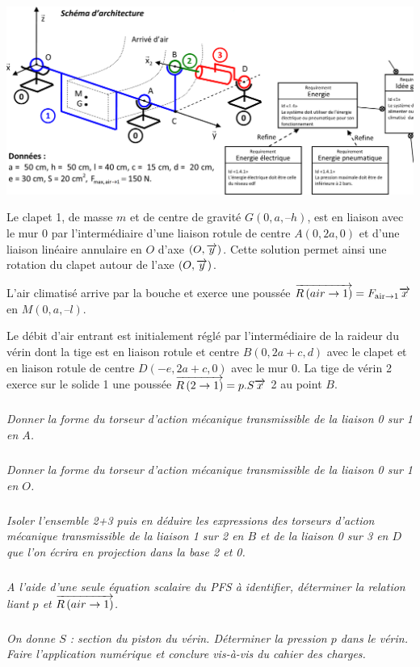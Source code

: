 \documentclass[10pt]{article}
\begin{document}
\begin{center}
\includegraphics[width=.95\textwidth]{images/img2}
\end{center}


Le clapet 1, de masse $m$ et de centre de gravité $G (0,a,–h)$, est en liaison avec le mur 0 par l’intermédiaire d’une liaison rotule de centre $A (0,2a,0)$ et d’une liaison linéaire annulaire en $O$ d’axe $(O, \overrightarrow{y})$. Cette solution permet ainsi une rotation du clapet autour de l’axe $(O, \overrightarrow{y})$.

L’air climatisé arrive par la bouche et exerce une poussée $\overrightarrow{R\left( {air} \rightarrow {1}\right)} = F_{\text{air}\rightarrow 1}\overrightarrow{x}$ en $M (0,a,–l)$.  

Le débit d’air entrant est initialement réglé par l’intermédiaire de la raideur du vérin dont la tige est en liaison rotule et centre $B (0,2a+c,d)$  avec le clapet et en liaison rotule de centre $D (-e,2a+c,0)$  avec le mur 0. La tige de vérin 2 exerce sur le solide 1 une poussée $\overrightarrow{R\left( {2} \rightarrow {1}\right)} = p.S \overrightarrow{x}$ 2 au point $B$.

\subparagraph{}
\textit{Donner la forme du torseur d’action mécanique transmissible de la liaison 0 sur 1 en $A$.}
 
 \subparagraph{}
 \textit{Donner la forme du torseur d’action mécanique transmissible de la liaison 0 sur 1 en $O$.}

 \subparagraph{}
 \textit{Isoler l’ensemble 2+3 puis en déduire les expressions des torseurs d’action mécanique transmissible de la liaison 1 sur 2 en $B$ et de la liaison 0 sur 3 en $D$ que l’on écrira en projection dans la base 2 et 0.}
 
  \subparagraph{}
 \textit{A l’aide d’une seule équation scalaire du PFS à identifier, déterminer la relation liant $p$ et 
 $\overrightarrow{R\left( {air} \rightarrow {1}\right)}$.}
 
\subparagraph{}
\textit{On donne $S$ : section du piston du vérin. Déterminer la pression $p$ dans le vérin. Faire l’application numérique et conclure vis-à-vis du cahier des charges.}
\end{document}
